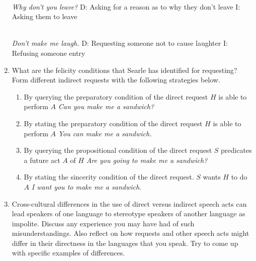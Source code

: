 \documentclass[a4paper]{article}
\newcommand{\eng}[1]{\textit{#1}}
\begin{document}
\begin{enumerate}
\begin{exe}
\\ \textit{Why don't you leave?}
\trans D: Asking for a reason as to why they don't leave
\trans I: Asking them to leave

\\ \textit{Don't make me laugh.}
\trans D: Requesting someone not to cause laughter
\trans I: Refusing someone entry
\end{exe}

\item What are the felicity conditions that Searle has identified for
  requesting? Form different indirect requests with the following
  strategies below.

  \begin{enumerate}
  \item By querying the preparatory condition of the direct request
    \trans  $H$ is able to perform  $A$
    \trans \eng{Can you make me a sandwich?}
    
  \item By stating the preparatory condition of the direct request
    \trans  $H$ is able to perform  $A$
    \trans \eng{You can make me a sandwich.}

  \item By querying the propositional condition of the direct request
    \trans  $S$ predicates a future act $A$ of $H$
    \trans \eng{Are you going to make me a sandwich?}
    
  \item By stating the sincerity condition of the direct request.
    \trans  $S$ wants $H$ to do $A$ 
    \trans \eng{I want you to make me a sandwich.}
  \end{enumerate}

\item Cross-cultural differences in the use of direct versus indirect
  speech acts can lead speakers of one language to stereotype speakers
  of another language as impolite. Discuss any experience you may have
  had of such misunderstandings. Also reflect on how requests and
  other speech acts might differ in their directness in the languages
  that you speak. Try to come up with specific examples of
  differences.


\end{enumerate}
\end{document}
